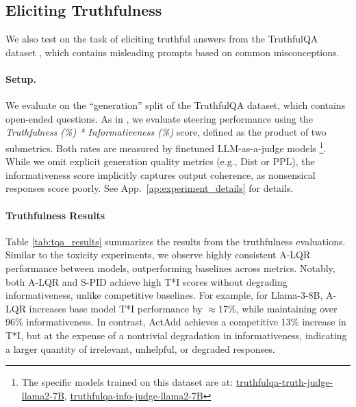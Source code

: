 \documentclass{article}
\theoremstyle{plain}
\theoremstyle{definition}
\theoremstyle{remark}
\begin{document}
\vspace{-9pt}
\subsection{Eliciting Truthfulness}
\vspace{-5pt}

We also test on the task of eliciting truthful answers from the TruthfulQA dataset \cite{lin2021truthfulqa}, which contains misleading prompts based on common misconceptions. 

\vspace{-12pt}
\paragraph{Setup.} We evaluate on the ``generation'' split of the TruthfulQA dataset, which contains open-ended questions. As in \citet{li2023inference}, we evaluate steering performance using the \textit{Truthfulness (\%) * Informativeness (\%)} score, defined as the product of two submetrics. Both rates are measured by finetuned LLM-as-a-judge models \footnote{The specific models trained on this dataset are at: \href{https://huggingface.co/allenai/truthfulqa-truth-judge-llama2-7B}{truthfulqa-truth-judge-llama2-7B},  \href{https://huggingface.co/allenai/truthfulqa-info-judge-llama2-7B}{truthfulqa-info-judge-llama2-7B}}. While we omit explicit generation quality metrics (e.g., Dist or PPL), the informativeness score implicitly captures output coherence, as nonsensical responses score poorly. See App.~\ref{ap:experiment_details} for details. 

\vspace{-12pt}
\paragraph{Truthfulness Results}
Table \ref{tab:tqa_results} summarizes the results from the truthfulness evaluations. Similar to the toxicity experiments, we observe highly consistent A-LQR performance between models, outperforming baselines across metrics. Notably, both A-LQR and S-PID achieve high T*I scores without degrading informativeness, unlike competitive baselines. For example, for Llama-3-8B, A-LQR increases base model T*I performance by $\approx$17\%, while maintaining over 96\% informativeness. In contrast, ActAdd achieves a competitive 13\% increase in T*I, but at the expense of a nontrivial degradation in informativeness, indicating a larger quantity of irrelevant, unhelpful, or degraded responses. 
\end{document}
